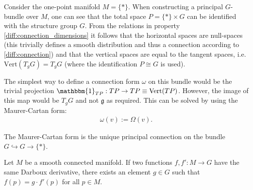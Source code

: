     \begin{construct}
        Consider the one-point manifold $M=\{\ast\}$. When constructing a principal $G$-bundle over $M$, one can see that the total space $P=\{\ast\}\times G$ can be identified with the structure group $G$. From the relations in property \ref{diff:connection_dimensions} it follows that the horizontal spaces are null-spaces (this trivially defines a smooth distribution and thus a connection according to \ref{diff:connection}) and that the vertical spaces are equal to the tangent spaces, i.e. $\text{Vert}(T_gG)=T_gG$ (where the identification $P\cong G$ is used).

        The simplest way to define a connection form $\omega$ on this bundle would be the trivial projection $\mathbbm{1}_{TP}:TP\rightarrow TP\equiv\text{Vert}(TP)$. However, the image of this map would be $T_gG$ and not $\mathfrak{g}$ as required. This can be solved by using the Maurer-Cartan form:
        \begin{gather}
            \omega(v) := \Omega(v).
        \end{gather}
    \end{construct}
    \begin{property}
        The Maurer-Cartan form is the unique principal connection on the bundle $G\hookrightarrow G\rightarrow\{\ast\}$.
    \end{property}

    \begin{property}
        Let $M$ be a smooth connected manifold. If two functions $f,f':M\rightarrow G$ have the same Darboux derivative, there exists an element $g\in G$ such that $f(p)=g\cdot f'(p)$ for all $p\in M$.
    \end{property}

